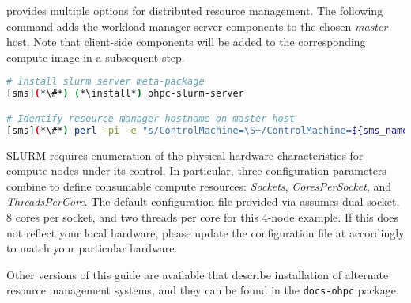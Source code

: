 \OHPC{} provides multiple options for distributed resource management. 
The following command adds the \SLURM{} workload manager server components to the
chosen {\em master} host. Note that client-side components will be added to
the corresponding compute image in a subsequent step.

\begin{lstlisting}[language=bash,keywords={}]
# Install slurm server meta-package
[sms](*\#*) (*\install*) ohpc-slurm-server

# Identify resource manager hostname on master host
[sms](*\#*) perl -pi -e "s/ControlMachine=\S+/ControlMachine=${sms_name}/" /etc/slurm/slurm.conf
\end{lstlisting}

\begin{center}
\begin{tcolorbox}[]
  \small SLURM requires enumeration of the physical hardware characteristics
  for compute nodes under its control. In particular, three configuration
  parameters combine to define consumable compute resources: {\em Sockets},
  {\em CoresPerSocket}, and {\em ThreadsPerCore}. The default configuration
  file provided via \OHPC{} assumes dual-socket, 8 cores per socket, and two
  threads per core for this 4-node example. If this does not reflect your local
  hardware, please update the configuration file at
   accordingly to match your particular hardware.
\end{tcolorbox}
\end{center}


Other versions of this guide are available that describe installation of alternate
resource management systems, and they can be found in the \texttt{docs-ohpc}
package.

